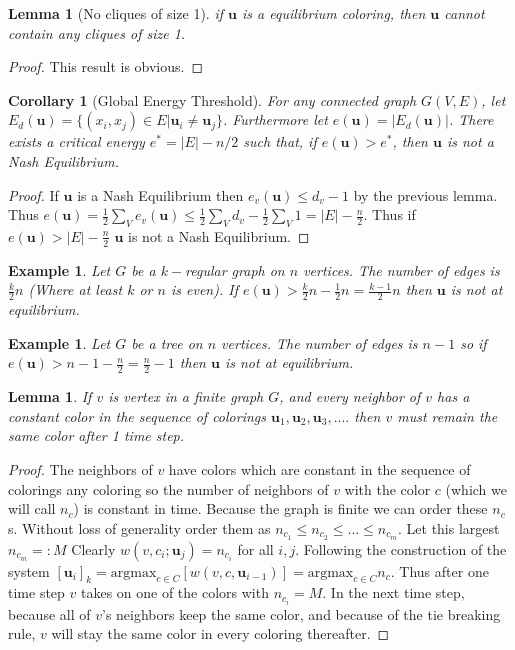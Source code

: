 \documentclass[]{article}
\newtheorem{corrollary}[theorem]{Corollary}
\newtheorem{lemma}[theorem]{Lemma}
\newtheorem{example}[theorem]{Example}
\newcommand{\uu}{\mathbf{u}}
\begin{document}
\begin{lemma}[No cliques of size 1]
	if $\uu$ is a equilibrium coloring, then $\uu$ cannot contain any cliques of size 1.
\end{lemma}
\begin{proof}
	This result is obvious.
\end{proof}

\begin{corrollary}[Global Energy Threshold]
	For any connected graph $G(V,E)$, let $E_d(\uu)=\{(x_i,x_j)\in E| \uu_{i}\neq \uu_{j}  \}$. Furthermore let $e(\uu)=|E_d(\uu)|$. There exists a critical energy $e^*=|E|- n/2$  such that, if $e(\uu)>e^*$, then $\uu$ is not a Nash Equilibrium. 
\end{corrollary}

\begin{proof}
	If $\uu$ is a Nash Equilibrium then $e_v(\uu)\leq d_v-1$ by the previous lemma. Thus $e(\uu)=\frac{1}{2}\sum_Ve_v(\uu)\leq \frac{1}{2}\sum_Vd_v-\frac{1}{2}\sum_V1 = |E|-\frac{n}{2}$. Thus if $e(\uu)>|E|-\frac{n}{2}$ $\uu$ is not a Nash Equilibrium. 
\end{proof}

\begin{example}
	Let $G$ be a $k-$regular graph on $n$ vertices. The number of edges is $\frac{k}{2}n$ (Where at least $k$ or $n$ is even). If $e(\uu)>\frac{k}{2}n-\frac{1}{2}n = \frac{k-1}{2}n$ then $\uu$ is not at equilibrium.
\end{example}
\begin{example}
	Let $G$ be a tree on $n$ vertices. The number of edges is $n-1$ so if $e(\uu)> n-1-\frac{n}{2}=\frac{n}{2}-1$ then $\uu$ is not at equilibrium. 
\end{example}

\begin{lemma}
	If $v$ is vertex in a finite graph $G$, and every neighbor of $v$ has a constant color in the sequence of colorings $\uu_1,\uu_2,\uu_3,....$ then $v$ must remain the same color after 1 time step. 
\end{lemma}
\begin{proof}
	The neighbors of $v$ have colors which are constant in the sequence of colorings any coloring so the number of neighbors of $v$ with the color $c$ (which we will call $n_c$) is constant in time. Because the graph is finite we can order these $n_c$s. Without loss of generality order them as $n_{c_1}\leq n_{c_2}\leq...\leq n_{c_m}$. Let this largest $n_{c_m}=:M$ Clearly $w(v,c_i;\uu_j)=n_{c_i}$ for all $i,j$. Following the construction of the system $[\uu_i]_k=\text{argmax}_{c\in C}[w(v,c,\uu_{i-1})]= \text{argmax}_{c\in C} n_{c}$. Thus after one time step $v$ takes on one of the colors with $n_{c_i}=M$. In the next time step, because all of $v$'s neighbors keep the same color, and because of the tie breaking rule, $v$ will stay the same color in every coloring thereafter. 
\end{proof}
\end{document}
